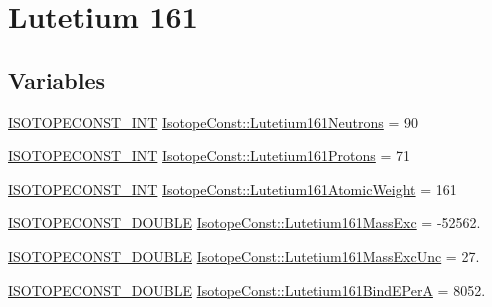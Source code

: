 \hypertarget{group___isotope_const-_lutetium-_lu161}{}\section{Lutetium 161}
\label{group___isotope_const-_lutetium-_lu161}
\subsection*{Variables}
\begin{DoxyCompactItemize}
\item 
\mbox{\hyperlink{group___isotope_const-_macros_ga5f18360b3e99483a35c32d789e62621c}{I\+S\+O\+T\+O\+P\+E\+C\+O\+N\+S\+T\+\_\+\+I\+NT}} \mbox{\hyperlink{group___isotope_const-_lutetium-_lu161_ga76e1bf7eb3f767a28a636c7e3d712329}{Isotope\+Const\+::\+Lutetium161\+Neutrons}} = 90
\item 
\mbox{\hyperlink{group___isotope_const-_macros_ga5f18360b3e99483a35c32d789e62621c}{I\+S\+O\+T\+O\+P\+E\+C\+O\+N\+S\+T\+\_\+\+I\+NT}} \mbox{\hyperlink{group___isotope_const-_lutetium-_lu161_ga6994b8cf59c0dcec64e88b36383a1c18}{Isotope\+Const\+::\+Lutetium161\+Protons}} = 71
\item 
\mbox{\hyperlink{group___isotope_const-_macros_ga5f18360b3e99483a35c32d789e62621c}{I\+S\+O\+T\+O\+P\+E\+C\+O\+N\+S\+T\+\_\+\+I\+NT}} \mbox{\hyperlink{group___isotope_const-_lutetium-_lu161_ga09be5c76f2b30b4c4fdc888c1637add6}{Isotope\+Const\+::\+Lutetium161\+Atomic\+Weight}} = 161
\item 
\mbox{\hyperlink{group___isotope_const-_macros_ga8f45a7272ce02c0b4c65c44636ed719a}{I\+S\+O\+T\+O\+P\+E\+C\+O\+N\+S\+T\+\_\+\+D\+O\+U\+B\+LE}} \mbox{\hyperlink{group___isotope_const-_lutetium-_lu161_ga1fe3ad9d62c011bb78d59adbfc6b35fe}{Isotope\+Const\+::\+Lutetium161\+Mass\+Exc}} = -\/52562.
\item 
\mbox{\hyperlink{group___isotope_const-_macros_ga8f45a7272ce02c0b4c65c44636ed719a}{I\+S\+O\+T\+O\+P\+E\+C\+O\+N\+S\+T\+\_\+\+D\+O\+U\+B\+LE}} \mbox{\hyperlink{group___isotope_const-_lutetium-_lu161_gad7a90b901e81922b9042ee570d8487e7}{Isotope\+Const\+::\+Lutetium161\+Mass\+Exc\+Unc}} = 27.
\item 
\mbox{\hyperlink{group___isotope_const-_macros_ga8f45a7272ce02c0b4c65c44636ed719a}{I\+S\+O\+T\+O\+P\+E\+C\+O\+N\+S\+T\+\_\+\+D\+O\+U\+B\+LE}} \mbox{\hyperlink{group___isotope_const-_lutetium-_lu161_gad76cc612a093c5541ab55009ac12eba5}{Isotope\+Const\+::\+Lutetium161\+Bind\+E\+PerA}} = 8052.
\item 

\end{DoxyCompactItemize}
